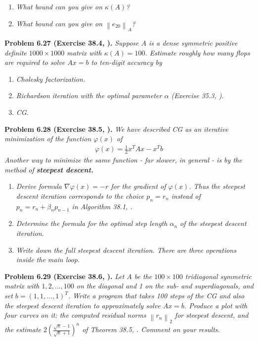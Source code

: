 \documentclass[a4paper,oneside]{book}
\numberwithin{equation}{chapter}
\begin{document}
\begin{enumerate}
\item \textit{What bound can you give on $\kappa \left(A\right)$?}
\item \textit{What bound can you give on $\left\|e_{20}\right\|_A$?}
\end{enumerate}
\textbf{Problem 6.27 (Exercise 38.4, \cite{1}).} \textit{Suppose $A$ is a dense symmetric positive definite $1000\times 1000$ matrix with $\kappa \left(A\right)=100$. Estimate roughly how many flops are required to solve $Ax=b$ to ten-digit accuracy by}
\begin{enumerate}
\item \textit{Cholesky factorization.}
\item  \textit{Richardson iteration with the optimal parameter $\alpha$ (Exercise 35.3, \cite{1})}.
\item \textit{CG}.
\end{enumerate}
\textbf{Problem 6.28 (Exercise 38.5, \cite{1}).} \textit{We have described CG as an iterative minimization of the function $\varphi \left(x\right)$ of}
\begin{align}
\varphi \left( x \right) = \frac{1}{2}{x^T}Ax - {x^T}b
\end{align}
\textit{Another way to minimize the same function - far slower, in general - is by the method of \textbf{steepest descent.}}
\begin{enumerate}
\item \textit{Derive formula $\nabla \varphi \left( x \right) =  - r$ for the gradient of $\varphi \left(x\right)$. Thus the steepest descent iteration corresponds to the choice $p_n=r_n$ instead of $p_n=r_n+\beta _n p_{n-1}$ in Algorithm 38.1, \cite{1}.}
\item \textit{Determine the formula for the optimal step length $\alpha _n$ of the steepest descent iteration.}
\item \textit{Write down the full steepest descent iteration. There are three operations inside the main loop.}
\end{enumerate}
\textbf{Problem 6.29 (Exercise 38.6, \cite{1}).} \textit{Let $A$ be the $100\times 100$ tridiagonal symmetric matrix with $1,2,\ldots,100$ on the diagonal and 1 on the sub- and superdiagonals, and set $b=\left(1,1,\ldots,1\right)^T$. Write a program that takes 100 steps of the CG and also the steepest descent iteration to approximately solve $Ax=b$. Produce a plot with four curves on it: the computed residual norms $\left\|r_n\right\|_2$ for steepest descent, and the estimate $2{\left( {\frac{{\sqrt \kappa   - 1}}{{\sqrt \kappa   + 1}}} \right)^n}$ of Theorem 38.5, \cite{1}. Comment on your results.}
\end{document}
